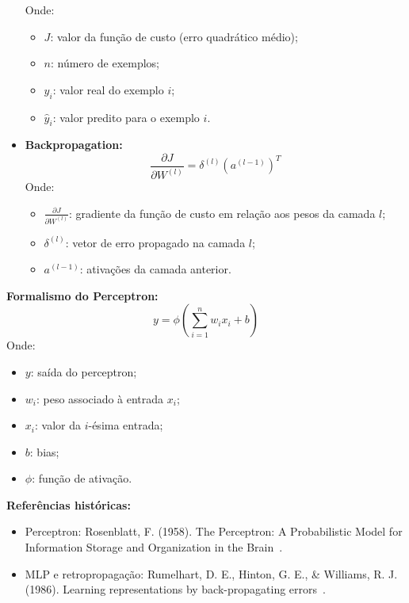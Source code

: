 \documentclass[11pt]{article}
\begin{document}
\begin{itemize}
\[    \]
    Onde:
    \begin{itemize}
        \item $J$: valor da função de custo (erro quadrático médio);
        \item $n$: número de exemplos;
        \item $y_i$: valor real do exemplo $i$;
        \item $\hat{y}_i$: valor predito para o exemplo $i$.
    \end{itemize}
    \item \textbf{Backpropagation:}
    \[
    \frac{\partial J}{\partial W^{(l)}} = \delta^{(l)} (a^{(l-1)})^T
    \]
    Onde:
    \begin{itemize}
        \item $\frac{\partial J}{\partial W^{(l)}}$: gradiente da função de custo em relação aos pesos da camada $l$;
        \item $\delta^{(l)}$: vetor de erro propagado na camada $l$;
        \item $a^{(l-1)}$: ativações da camada anterior.
    \end{itemize}
\end{itemize}

\textbf{Formalismo do Perceptron:}
\[
y = \phi\left(\sum_{i=1}^n w_i x_i + b\right)
\]
Onde:
\begin{itemize}
    \item $y$: saída do perceptron;
    \item $w_i$: peso associado à entrada $x_i$;
    \item $x_i$: valor da $i$-ésima entrada;
    \item $b$: bias;
    \item $\phi$: função de ativação.
\end{itemize}

\textbf{Referências históricas:}
\begin{itemize}
    \item Perceptron: Rosenblatt, F. (1958). The Perceptron: A Probabilistic Model for Information Storage and Organization in the Brain~\cite{rosenblatt1958perceptron}.
    \item MLP e retropropagação: Rumelhart, D. E., Hinton, G. E., \& Williams, R. J. (1986). Learning representations by back-propagating errors~\cite{rumelhart1986learning}.
\end{itemize}
\end{document}
